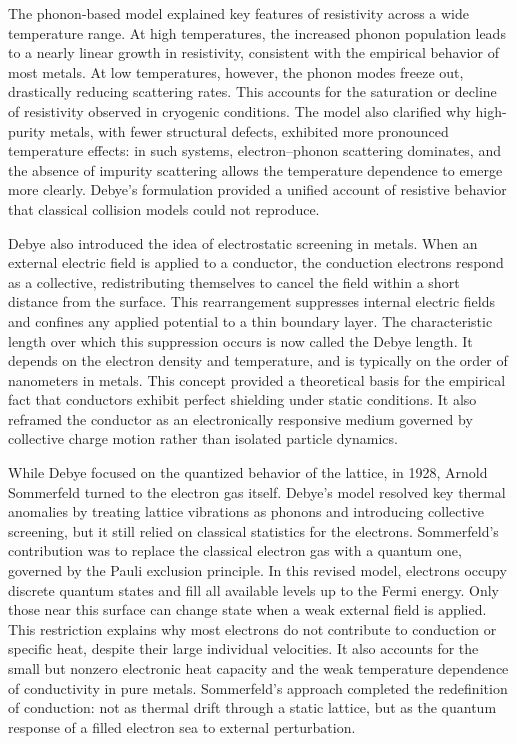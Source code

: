The phonon-based model explained key features of resistivity across a wide temperature range. At high temperatures, the increased phonon population leads to a nearly linear growth in resistivity, consistent with the empirical behavior of most metals. At low temperatures, however, the phonon modes freeze out, drastically reducing scattering rates. This accounts for the saturation or decline of resistivity observed in cryogenic conditions. The model also clarified why high-purity metals, with fewer structural defects, exhibited more pronounced temperature effects: in such systems, electron–phonon scattering dominates, and the absence of impurity scattering allows the temperature dependence to emerge more clearly. Debye’s formulation provided a unified account of resistive behavior that classical collision models could not reproduce.

Debye also introduced the idea of electrostatic screening in metals. When an external electric field is applied to a conductor, the conduction electrons respond as a collective, redistributing themselves to cancel the field within a short distance from the surface. This rearrangement suppresses internal electric fields and confines any applied potential to a thin boundary layer. The characteristic length over which this suppression occurs is now called the Debye length. It depends on the electron density and temperature, and is typically on the order of nanometers in metals. This concept provided a theoretical basis for the empirical fact that conductors exhibit perfect shielding under static conditions. It also reframed the conductor as an electronically responsive medium governed by collective charge motion rather than isolated particle dynamics.

While Debye focused on the quantized behavior of the lattice, in 1928, Arnold Sommerfeld turned to the electron gas itself. Debye’s model resolved key thermal anomalies by treating lattice vibrations as phonons and introducing collective screening, but it still relied on classical statistics for the electrons. Sommerfeld’s contribution was to replace the classical electron gas with a quantum one, governed by the Pauli exclusion principle. In this revised model, electrons occupy discrete quantum states and fill all available levels up to the Fermi energy. Only those near this surface can change state when a weak external field is applied. This restriction explains why most electrons do not contribute to conduction or specific heat, despite their large individual velocities. It also accounts for the small but nonzero electronic heat capacity and the weak temperature dependence of conductivity in pure metals. Sommerfeld’s approach completed the redefinition of conduction: not as thermal drift through a static lattice, but as the quantum response of a filled electron sea to external perturbation.

